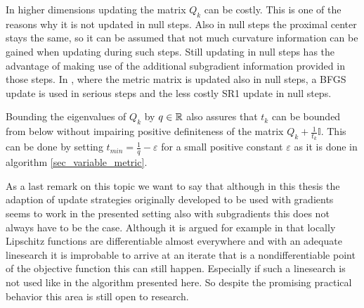 In higher dimensions updating the matrix \(Q_k\) can be costly. This is one of the reasons why it is not updated in null steps. Also in null steps the proximal center stays the same, so it can be assumed that not much curvature information can be gained when updating during such steps.
Still updating in null steps has the advantage of making use of the additional subgradient information provided in those steps.
In \cite{Haarala2007}, where the metric matrix is updated also in null steps, a BFGS update is used in serious steps and the less costly SR1 update in null steps.


\begin{remark}
	Bounding the eigenvalues of \(Q_k\) by \(q \in \mathbb{R}\) also assures that \(t_k\) can be bounded from below without impairing positive definiteness of the matrix \(Q_k+\frac{1}{t_k}\mathbb{I}\). This can be done by setting \(t_{min} = \frac{1}{q} - \varepsilon \) for a small positive constant \(\varepsilon\) as it is done in algorithm \ref{sec_variable_metric}.
\end{remark} 

As a last remark on this topic we want to say that although in this thesis the adaption of update strategies originally developed to be used with gradients seems to work in the presented setting also with subgradients this does not always have to be the case.
Although it is argued for example in \cite{Lewis2008} that locally Lipschitz functions are differentiable almost everywhere and with an adequate linesearch it is improbable to arrive at an iterate that is a nondifferentiable point of the objective function this can still happen. Especially if such a linesearch is not used like in the algorithm presented here.
So despite the promising practical behavior this area is still open to research.






